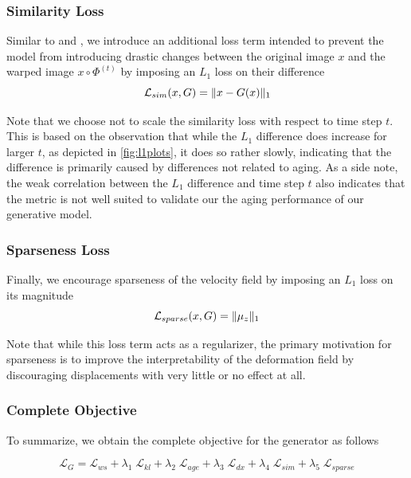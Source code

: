 \subsubsection*{Similarity Loss}
Similar to \cite{baumgartner2018visual} and \cite{wegmayr2019generative}, we introduce an additional loss term intended to prevent the model from introducing drastic changes between the original image $x$ and the warped image $ x \circ \Phi^{(t)} $ by imposing an $L_1$ loss on their difference
\begin{equation}
	\mathcal{L}_{sim}( x, G ) = \lVert x - G(x) \rVert_1
\end{equation}

Note that we choose not to scale the similarity loss with respect to time step $t$. This is based on the observation that while the $L_1$ difference does increase for larger $t$, as depicted in \autoref{fig:l1plots}, it does so rather slowly, indicating that the difference is primarily caused by differences not related to aging. As a side note, the weak correlation between the $L_1$ difference and time step $t$ also indicates that the metric is not well suited to validate our the aging performance of our generative model.

\subsubsection*{Sparseness Loss}
Finally, we encourage sparseness of the velocity field by imposing an $L_1$ loss on its magnitude
\begin{equation}
	\mathcal{L}_{sparse}( x, G ) = \lVert\mu_z\rVert_1
\end{equation}

Note that while this loss term acts as a regularizer, the primary motivation for sparseness is to improve the interpretability of the deformation field by discouraging displacements with very little or no effect at all.

\subsubsection*{Complete Objective}
To summarize, we obtain the complete objective for the generator as follows

\begin{equation}
	\mathcal{L}_G =
		\mathcal{L}_{ws} +
		\lambda_{1} \; \mathcal{L}_{kl} +
		\lambda_{2} \; \mathcal{L}_{age} + 
		\lambda_{3} \; \mathcal{L}_{dx} + 
		\lambda_{4} \; \mathcal{L}_{sim} + 
		\lambda_{5} \; \mathcal{L}_{sparse}
\end{equation}

